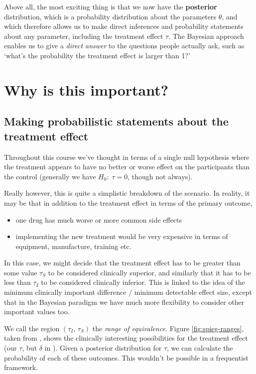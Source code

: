 \documentclass[
  openany]{book}
\providecommand{\tightlist}{%
  \setlength{\itemsep}{0pt}\setlength{\parskip}{0pt}}
\theoremstyle{definition}
\theoremstyle{definition}
\theoremstyle{definition}
\theoremstyle{definition}
\theoremstyle{remark}
\begin{document}
Above all, the most exciting thing is that we now have the \textbf{posterior} distribution, which is a probability distribution about the parameters \(\theta\), and which therefore allows us to make direct inferences and probability statements about any parameter, including the treatment effect \(\tau\). The Bayesian approach enables us to give a \emph{direct answer} to the questions people actually ask, such as `what's the probability the treatment effect is larger than 1?'

\section{Why is this important?}\label{why-is-this-important}

\subsection*{Making probabilistic statements about the treatment effect}\label{making-probabilistic-statements-about-the-treatment-effect}

Throughout this course we've thought in terms of a single null hypothesis where the treatment appears to have no better or worse effect on the participants than the control (generally we have \(H_0:\; \tau=0\), though not always).

Really however, this is quite a simplistic breakdown of the scenario. In reality, it may be that in addition to the treatment effect in terms of the primary outcome,

\begin{itemize}
\tightlist
\item
  one drug has much worse or more common side effects
\item
  implementing the new treatment would be very expensive in terms of equipment, manufacture, training etc.
\end{itemize}

In this case, we might decide that the treatment effect has to be greater than some value \(\tau_S\) to be considered clinically superior, and similarly that it has to be less than \(\tau_I\) to be considered clinically inferior. This is linked to the idea of the minimum clinically important difference / minimum detectable effect size, except that in the Bayesian paradigm we have much more flexibility to consider other important values too.

We call the region \(\left(\tau_I,\,\tau_S\right)\) the \emph{range of equivalence}. Figure \ref{fig:spieg-ranges}, taken from \citet{spiegelhalter1994bayesian}, shows the clinically interesting possibilities for the treatment effect (our \(\tau\), but \(\delta\) in \citet{spiegelhalter1994bayesian}). Given a posterior distribution for \(\tau\), we can calculate the probability of each of these outcomes. This wouldn't be possible in a frequentist framework.
\end{document}
